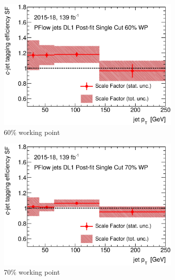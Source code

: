 \documentclass[letterpaper,12pt]{article}
\begin{document}
\newpage
\begin{figure}[H]
	\centering
	\begin{subfigure}[t]{.35\linewidth}
		\includegraphics[width=1\textwidth]{FTAG_plots/DL1allPFlowDec/SF60.eps}
		\caption{60\% working point}
			\end{subfigure}
		\begin{subfigure}[t]{.35\linewidth}
			\includegraphics[width=1\textwidth]{FTAG_plots/DL1allPFlowDec/SF70.eps}
			\caption{70\% working point}
		\end{subfigure}
		\begin{subfigure}[t]{.35\linewidth}

\end{subfigure}
\end{figure}
\end{document}
